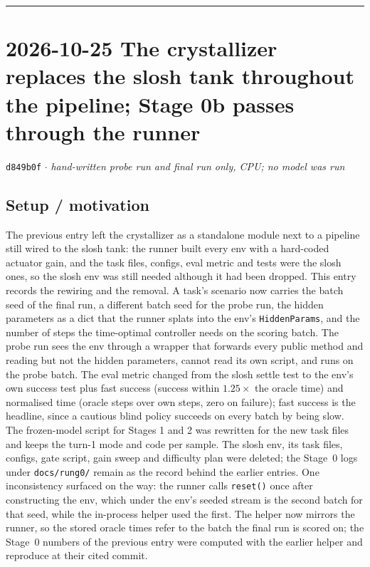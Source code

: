 \documentclass[11pt,a4paper]{article}
\newcommand{\commit}[1]{\texttt{\textcolor{commitgray}{#1}}}
\begin{document}
\bigskip
\hrule
\bigskip

\section*{2026-10-25 \quad The crystallizer replaces the slosh tank throughout
the pipeline; Stage 0b passes through the runner}

\commit{d849b0f} $\cdot$ \textit{hand-written probe run and final run only, CPU;
no model was run}

\subsection*{Setup / motivation}

The previous entry left the crystallizer as a standalone module next to a
pipeline still wired to the slosh tank: the runner built every env with a
hard-coded actuator gain, and the task files, configs, eval metric and tests
were the slosh ones, so the slosh env was still needed although it had been
dropped. This entry records the rewiring and the removal. A task's scenario
now carries the batch seed of the final run, a different batch seed for the
probe run, the hidden parameters as a dict that the runner splats into the
env's \texttt{HiddenParams}, and the number of steps the time-optimal
controller needs on the scoring batch. The probe run sees the env through a
wrapper that forwards every public method and reading but not the hidden
parameters, cannot read its own script, and runs on the probe batch. The eval
metric changed from the slosh settle test to the env's own success test plus
fast success (success within $1.25\times$ the oracle time) and normalised
time (oracle steps over own steps, zero on failure); fast success is the
headline, since a cautious blind policy succeeds on every batch by being
slow. The frozen-model script for Stages 1 and 2 was rewritten for the new
task files and keeps the turn-1 mode and code per sample. The slosh env, its
task files, configs, gate script, gain sweep and difficulty plan were
deleted; the Stage~0 logs under \texttt{docs/rung0/} remain as the record
behind the earlier entries. One inconsistency surfaced on the way: the runner
calls \texttt{reset()} once after constructing the env, which under the env's
seeded stream is the second batch for that seed, while the in-process helper
used the first. The helper now mirrors the runner, so the stored oracle times
refer to the batch the final run is scored on; the Stage~0 numbers of the
previous entry were computed with the earlier helper and reproduce at their
cited commit.
\end{document}
